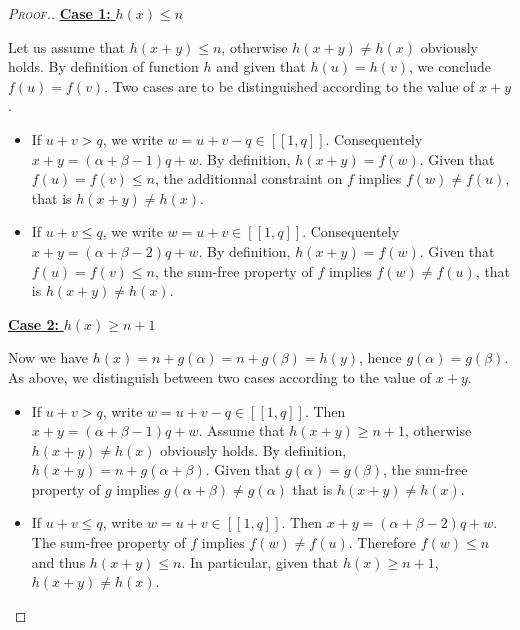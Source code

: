 \begin{proof}[\textsc{Proof.}]
	\noindent \underline{\textbf{Case 1:} \(h(x) \leqslant n\)}
	\par
	Let us assume that \(h(x+y) \leqslant n\), otherwise \(h(x + y) \neq h(x)\) obviously holds. By definition of function 
	\(h\) and given that \(h(u) = h(v)\), we conclude \(f(u) = f(v)\). Two cases are to be distinguished according to the value of \(x + y\).
	
	\begin{itemize}
	\item If \(u + v > q\), we write \(w = u + v - q \in [\![1, q]\!]\). Consequentely \(x + y = (\alpha + \beta - 1) q + w\). By definition, 
		\(h(x + y) = f(w)\). Given that \(f(u) = f(v) \leqslant n\), the additionnal constraint on \(f\) implies \(f(w) 
		\neq f(u)\), that is \(h(x + y) \neq h(x)\).
	\item If \(u + v \leqslant q\), we write \(w = u + v \in [\![1, q]\!]\). Consequentely \(x+y = (\alpha + \beta- 2) q + w\). By definition, 
		\(h(x + y) = f(w)\). Given that \(f(u) = f(v) \leqslant n\), the sum-free property of \(f\) implies \(f(w) \neq f(u)\), 
		that is \(h(x + y) \neq h(x)\).
	\end{itemize} 
	  
	\noindent \underline{\textbf{Case 2:} \(h(x) \geqslant n + 1\)}
	\par
	Now we have \(h(x) = n + g(\alpha) = 
	n + g(\beta) = h(y)\), hence \(g(\alpha) = g(\beta)\). As above, we distinguish between two cases according 
	to the value of \(x + y\).
	
	\begin{itemize}
	\item \begin{sloppypar}
		If \(u + v > q\), write \(w = u + v - q \in [\![1, q]\!]\). Then \(x + y = (\alpha + \beta - 1) q + w\). Assume that 
		\({h(x+y) \geqslant n + 1}\),  otherwise \(h(x + y) \neq h(x)\) obviously holds. By definition, \({h(x + y) = n + g(\alpha + 
		\beta)}\). Given that \(g(\alpha) = g(\beta)\), the sum-free property of \(g\) implies \(g(\alpha + \beta) 
		\neq g(\alpha)\) that is \(h(x + y) \neq h(x)\).
		\end{sloppypar}
	\item  If \(u + v \leqslant q\), write \(w = u + v \in [\![1, q]\!]\). Then \(x+y = (\alpha + \beta- 2) q + w\). The sum-free 
		property of \(f\) implies \(f(w) \neq f(u)\). Therefore \(f(w) \leqslant n\) and thus \(h(x + y) \leqslant n\). In particular,
		given that \(h(x) \geqslant n + 1\), \(h(x + y) \neq h(x)\).
	\end{itemize}
\end{proof}

